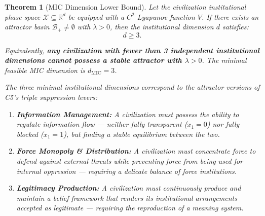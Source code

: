 \documentclass[12pt,a4paper]{article}
\newtheorem{theorem}{Theorem}[section]
\theoremstyle{definition}
\newcommand{\R}{\mathbb{R}}
\newcommand{\calB}{\mathcal{B}}
\newcommand{\calX}{\mathcal{X}}
\newcommand{\lb}{\lambda}
\newcommand{\Lyap}{V}
\begin{document}
\begin{theorem}[MIC Dimension Lower Bound]
\label{thm:mic_dim}
Let the civilization institutional phase space $\calX \subseteq \R^d$ be equipped with a $C^2$ Lyapunov function $\Lyap$. If there exists an attractor basin $\calB_{+} \neq \emptyset$ with $\lb>0$, then the institutional dimension $d$ satisfies:
\begin{equation}\label{eq:mic_bound}
    d \geq 3.
\end{equation}

Equivalently, \textbf{any civilization with fewer than 3 independent institutional dimensions cannot possess a stable attractor with $\lb>0$}. The minimal feasible MIC dimension is $d_{\text{MIC}} = 3$.

The three minimal institutional dimensions correspond to the attractor versions of C5's triple suppression levers:
\begin{enumerate}[label=\textbf{D\arabic*}, leftmargin=*]
    \item \textbf{Information Management:} A civilization must possess the ability to regulate information flow --- neither fully transparent ($x_1=0$) nor fully blocked ($x_1=1$), but finding a stable equilibrium between the two.
    \item \textbf{Force Monopoly \& Distribution:} A civilization must concentrate force to defend against external threats while preventing force from being used for internal oppression --- requiring a delicate balance of force institutions.
    \item \textbf{Legitimacy Production:} A civilization must continuously produce and maintain a belief framework that renders its institutional arrangements accepted as legitimate --- requiring the reproduction of a meaning system.
\end{enumerate}
\end{theorem}
\end{document}

